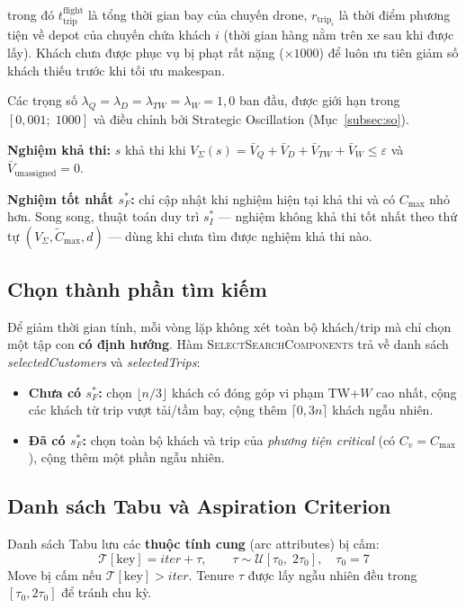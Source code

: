 \documentclass[../DoAn.tex]{subfiles}
\begin{document}
trong đó $t^{\text{flight}}_{\text{trip}}$ là tổng thời gian bay của chuyến drone, $r_{\text{trip}_i}$ là thời điểm phương tiện về depot của chuyến chứa khách $i$ (thời gian hàng nằm trên xe sau khi được lấy). Khách chưa được phục vụ bị phạt rất nặng ($\times 1000$) để luôn ưu tiên giảm số khách thiếu trước khi tối ưu makespan.

Các trọng số $\lambda_Q = \lambda_D = \lambda_{TW} = \lambda_W = 1{,}0$ ban đầu, được giới hạn trong $[0{,}001;\; 1000]$ và điều chỉnh bởi Strategic Oscillation (Mục~\ref{subsec:so}).

\textbf{Nghiệm khả thi:} $s$ khả thi khi $V_\Sigma(s) = \bar{V}_Q + \bar{V}_D + \bar{V}_{TW} + \bar{V}_W \leq \varepsilon$ và $\bar{V}_{\text{unassigned}} = 0$.

\textbf{Nghiệm tốt nhất $s^*_F$:} chỉ cập nhật khi nghiệm hiện tại khả thi và có $C_{\max}$ nhỏ hơn. Song song, thuật toán duy trì $s^*_I$ --- nghiệm không khả thi tốt nhất theo thứ tự $(V_\Sigma, \tilde{C}_{\max}, d)$ --- dùng khi chưa tìm được nghiệm khả thi nào.

\subsection{Chọn thành phần tìm kiếm}
\label{subsec:components}

Để giảm thời gian tính, mỗi vòng lặp không xét toàn bộ khách/trip mà chỉ chọn một tập con \textbf{có định hướng}. Hàm \textsc{SelectSearchComponents} trả về danh sách \textit{selectedCustomers} và \textit{selectedTrips}:

\begin{itemize}
    \item \textbf{Chưa có $s^*_F$:} chọn $\lfloor n/3 \rfloor$ khách có đóng góp vi phạm TW+$W$ cao nhất, cộng các khách từ trip vượt tải/tầm bay, cộng thêm $\lceil 0{,}3n \rceil$ khách ngẫu nhiên.
    \item \textbf{Đã có $s^*_F$:} chọn toàn bộ khách và trip của \textit{phương tiện critical} (có $C_v = C_{\max}$), cộng thêm một phần ngẫu nhiên.
\end{itemize}

\subsection{Danh sách Tabu và Aspiration Criterion}

Danh sách Tabu lưu các \textbf{thuộc tính cung} (arc attributes) bị cấm:
\[
\mathcal{T}[\text{key}] = \mathit{iter} + \tau, \qquad \tau \sim \mathcal{U}[\tau_0,\; 2\tau_0], \quad \tau_0 = 7
\]
Move bị cấm nếu $\mathcal{T}[\text{key}] > \mathit{iter}$. Tenure $\tau$ được lấy ngẫu nhiên đều trong $[\tau_0, 2\tau_0]$ để tránh chu kỳ.
\end{document}
